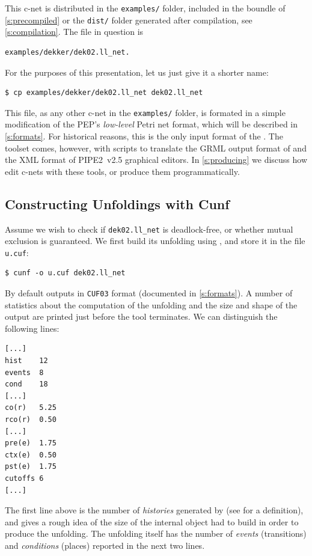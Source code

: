 \documentclass[a4paper]{refart}
\begin{document}
This c-net is distributed in the \verb!examples/! folder, included in the
boundle of \cref{s:precompiled} or the \verb!dist/! folder generated after
compilation, see \cref{s:compilation}.
The file in question is
\begin{verbatim}
examples/dekker/dek02.ll_net.
\end{verbatim}
For the purposes of this presentation, let us just give it a shorter name:
\begin{verbatim}
$ cp examples/dekker/dek02.ll_net dek02.ll_net
\end{verbatim}
This file, as any other c-net in the \verb!examples/! folder, is formated
in a simple modification of the PEP's \emph{low-level} Petri net
format, which will be described in \cref{s:formats}.
For historical reasons, this is the only input format of the \cunft{}.
The toolset comes, however, with
scripts to translate the GRML output format of \coloane\cite{Coloane}
and the XML format of PIPE2~v2.5\cite{BPK07} graphical editors.
In \cref{s:producing} we discuss how edit c-nets with these tools,
or produce them programmatically.

\subsection{Constructing Unfoldings with Cunf}%
\label{s:constructing}

Assume we wish to check if \verb!dek02.ll_net!
is deadlock-free, or whether mutual exclusion is guaranteed.
We first build its unfolding using \cunf,
and store it in the file \verb!u.cuf!:
\begin{verbatim}
$ cunf -o u.cuf dek02.ll_net
\end{verbatim}
By default \cunf outputs in \verb!CUF03! format
(documented in \cref{s:formats}).
A number of statistics about the computation of the unfolding
and the size and shape of the output are printed
just before the tool terminates.
We can distinguish the following lines:
\begin{verbatim}
[...]
hist    12
events  8
cond    18
[...]
co(r)   5.25
rco(r)  0.50
[...]
pre(e)  1.75
ctx(e)  0.50
pst(e)  1.75
cutoffs 6
[...]
\end{verbatim}
The first line above is the number of \emph{histories} generated by \cunf
(see\cite{BBCKRS12} for a definition), and gives a rough idea
of the size of the internal object \cunf had to build in order to produce the
unfolding.
The unfolding itself has the number of \emph{events} (transitions)
and \emph{conditions} (places)
reported in the next two lines.
\end{document}
